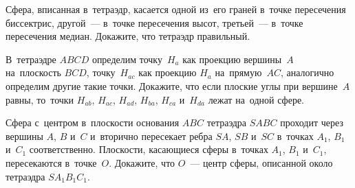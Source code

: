 \begin{problems}
\item
Сфера, вписанная в~тетраэдр, касается одной из~его граней в~точке пересечения
биссектрис, другой~--- в~точке пересечения высот, третьей~--- в~точке
пересечения медиан.
Докажите, что тетраэдр правильный.

\item
В~тетраэдре $ABCD$ определим
точку~$H_{a}$ как проекцию вершины~$A$ на~плоскость $BCD$,
точку~$H_{ac}$ как проекцию $H_{a}$ на~прямую~$AC$,
аналогично определим другие такие точки.
Докажите, что если плоские углы при вершине~$A$ равны, то~точки
$H_{ab}$, $H_{ac}$, $H_{ad}$, $H_{ba}$, $H_{ca}$ и~$H_{da}$ лежат на~одной
сфере.

\itemx{*}
Сфера с~центром в~плоскости основания $ABC$ тетраэдра $SABC$ проходит через
вершины $A$, $B$ и~$C$ и~вторично пересекает ребра $SA$, $SB$ и~$SC$ в~точках
$A_1$, $B_1$ и~$C_1$ соответственно.
Плоскости, касающиеся сферы в~точках $A_1$, $B_1$ и~$C_1$, пересекаются
в~точке~$O$.
Докажите, что $O$~--- центр сферы, описанной около тетраэдра $S A_1 B_1 C_1$.

\end{problems}

